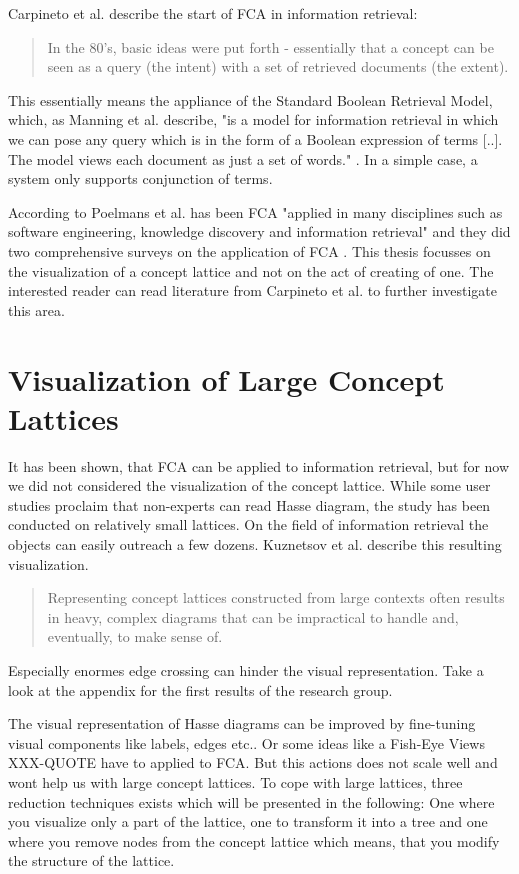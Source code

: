 \documentclass[11pt]{report}
\begin{document}
Carpineto et al.\cite{Carpineto2005} describe the start of FCA in information retrieval:

\begin{quote}
In the 80's, basic ideas were put forth - essentially that a concept can be seen as a query (the intent) with a set of retrieved documents (the extent).
\end{quote}

This essentially means the appliance of the Standard Boolean Retrieval Model, which, as Manning et al. \cite{Manning2009} describe, "is a model for information retrieval in which we can pose any query which is in the form of a Boolean expression of terms [..]. The model views each document as just a set of words." . In a simple case, a system only supports conjunction of terms.

According to Poelmans et al. has been FCA "applied in many disciplines such as software engineering, knowledge discovery and information retrieval" \cite{Poelmans2013} and they did two comprehensive surveys on the application of FCA \cite{Poelmans2013, Poelmans2013b}. This thesis focusses on the visualization of a concept lattice and not on the act of creating of one. The interested reader can read literature from Carpineto et al. \cite{carpineto2004concept,Carpineto2005} to further investigate this area.

\section{Visualization of Large Concept Lattices}

It has been shown, that FCA can be applied to information retrieval, but for now we did not considered the visualization of the concept lattice. While some user studies proclaim that non-experts can read Hasse diagram\cite{Eklund2004}, the study has been conducted on relatively small lattices. On the field of information retrieval the objects can easily outreach a few dozens. Kuznetsov et al. \cite{Kuznetsov20072}  describe this resulting visualization.
\begin{quote}
Representing concept lattices constructed from large contexts often results in heavy, complex diagrams that can be impractical to handle and, eventually, to make sense of.	
\end{quote}
Especially enormes edge crossing can hinder the visual representation. Take a look at the appendix for the first results of the research group. 

The visual representation of Hasse diagrams can be improved by fine-tuning visual components like labels, edges etc.. Or some ideas like a Fish-Eye Views XXX-QUOTE have to applied to FCA. But this actions does not scale well and wont help us with large concept lattices. To cope with large lattices, three reduction techniques exists which will be presented in the following: One where you visualize only a part of the lattice, one to transform it into a tree and one where you remove nodes from the concept lattice which means, that you modify the structure of the lattice.
\end{document}
